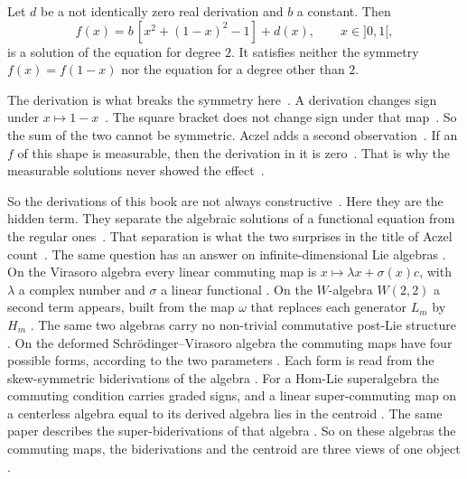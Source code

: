 \begin{example}\label{ex:fi:aczel-alpha-two}
Let $d$ be a not identically zero real derivation and $b$ a constant. Then
\[
  f(x) = b\,[x^2 + (1-x)^2 - 1] + d(x), \qquad x \in {]0,1[},
\]
is a solution of the equation for degree $2$. It satisfies neither the
symmetry $f(x) = f(1-x)$ nor the equation for a degree other than $2$.
\end{example}

The derivation is what breaks the symmetry
here~\cite[p.~199]{Aczel1981}. A derivation changes sign under $x \mapsto
1-x$~\cite[p.~199]{Aczel1981}. The square bracket does not change sign under
that map~\cite[p.~199]{Aczel1981}. So the sum of the two cannot be symmetric.
Aczel adds a second observation~\cite[p.~199]{Aczel1981}. If an $f$ of this
shape is measurable, then the derivation in it is
zero~\cite[p.~199]{Aczel1981}. That is why the measurable solutions never
showed the effect~\cite[p.~199]{Aczel1981}.

So the derivations of this book are not always
constructive~\cite[p.~191]{Aczel1981}. Here they are the hidden term. They
separate the algebraic solutions of a functional equation from the regular
ones~\cite[p.~199]{Aczel1981}. That separation is what the two surprises in
the title of Aczel count~\cite[p.~191]{Aczel1981}.
The same question has an answer on infinite-dimensional Lie algebras
\cite[p.~1]{Tang2016W22}. On the Virasoro algebra every linear commuting map is $x\mapsto\lambda x+\sigma(x)c$,
with $\lambda$ a complex number and $\sigma$ a linear functional
\cite[Theorem~4.2, p.~9]{Tang2016W22}. On the $W$-algebra $W(2,2)$ a second term
appears, built from the map $\omega$ that replaces each generator $L_m$ by
$H_m$ \cite[Theorem~4.1, p.~9]{Tang2016W22}. The same two algebras carry no
non-trivial commutative post-Lie structure \cite[Theorem~4.6, p.~9]{Tang2016W22}.
On the deformed Schr\"odinger--Virasoro algebra the commuting maps have four
possible forms, according to the two parameters
\cite[Theorem~4.3, p.~11]{FanSuXu2016}. Each form is read from the
skew-symmetric biderivations of the algebra
\cite[Theorem~3.2, p.~4]{FanSuXu2016}.
For a Hom-Lie superalgebra the commuting condition carries graded signs, and a
linear super-commuting map on a centerless algebra equal to its derived algebra
lies in the centroid \cite[Theorem~4.2, p.~11]{Pandey2024Superbiderivations}.
The same paper describes the super-biderivations of that algebra
\cite[Theorem~3.8, p.~7]{Pandey2024Superbiderivations}. So on these algebras the
commuting maps, the biderivations and the centroid are three views of one
object \cite[p.~1]{Pandey2024Superbiderivations}.
